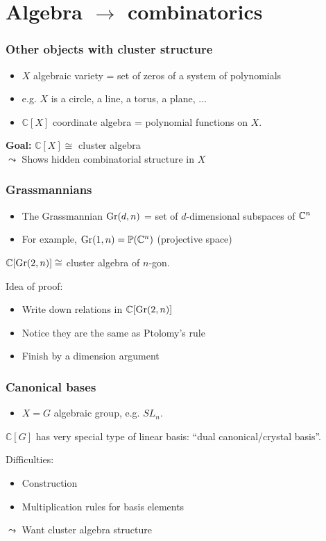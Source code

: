 \documentclass[aspectratio=169]{beamer}
\begin{document}
\section{Algebra $\to$ combinatorics}

\begin{frame}
	\frametitle{Other objects with cluster structure}

	\begin{itemize}
		\item $X$ algebraic variety = set of zeros of a system of polynomials
		\item e.g. $X$ is a circle, a line, a torus, a plane, ... \pause
		\item $\mathbb{C}[X]$ coordinate algebra = polynomial functions on $X$.
	\end{itemize}
	\pause
	\textbf{Goal:} $\mathbb{C}[X] \cong$ cluster algebra
	\\
	$\leadsto$ Shows hidden combinatorial structure in $X$

\end{frame}

\begin{frame}
	\frametitle{Grassmannians}
	\begin{itemize}
		\item The Grassmannian $\operatorname{Gr}(d,n)$ = set of $d$-dimensional subspaces of $\mathbb{C}^n$
		\item For example, $\operatorname{Gr}(1, n) = \mathbb{P}(\mathbb{C}^n)$ (projective space)
	\end{itemize}
	\pause
	\begin{theorem}
		$\mathbb{C}[\operatorname{Gr}(2,n)] \cong $ cluster algebra of $n$-gon.
	\end{theorem}
	\pause
	Idea of proof:
	\begin{itemize}
		\item Write down relations in $\mathbb{C}[\operatorname{Gr}(2,n)]$
		\item Notice they are the same as Ptolomy's rule
		\item Finish by a dimension argument
	\end{itemize}

\end{frame}

\begin{frame}
	\frametitle{Canonical bases}

	\begin{itemize}
		\item $X = G$ algebraic group, e.g. $SL_n$.
	\end{itemize}
	\pause
	\begin{theorem}
		$\mathbb{C}[G]$ has very special type of linear basis: ``dual canonical/crystal basis''.
	\end{theorem}
	\pause
	Difficulties:
	\begin{itemize}
		\item Construction
		\item Multiplication rules for basis elements
	\end{itemize}
	\pause
	$\leadsto$ Want cluster algebra structure

\end{frame}
\end{document}
